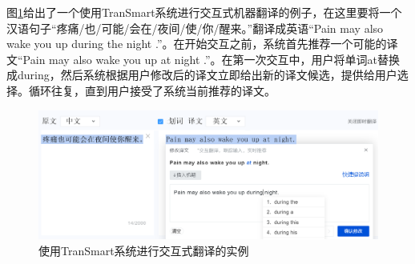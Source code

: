 \parinterval 图\ref{fig:18-2}给出了一个使用TranSmart系统进行交互式机器翻译的例子，在这里要将一个汉语句子“疼痛/也/可能/会在/夜间/使/你/醒来。”翻译成英语“Pain may also wake you up during the night .”。在开始交互之前，系统首先推荐一个可能的译文“Pain may also wake you up at night .”。在第一次交互中，用户将单词at替换成during，然后系统根据用户修改后的译文立即给出新的译文候选，提供给用户选择。循环往复，直到用户接受了系统当前推荐的译文。

\begin{figure}[htp]
\centering
\includegraphics[scale=0.4]{./Chapter18/Figures/figure-transSmart.png}
\caption{使用TranSmart系统进行交互式翻译的实例}
\label{fig:18-2}
\end{figure}

